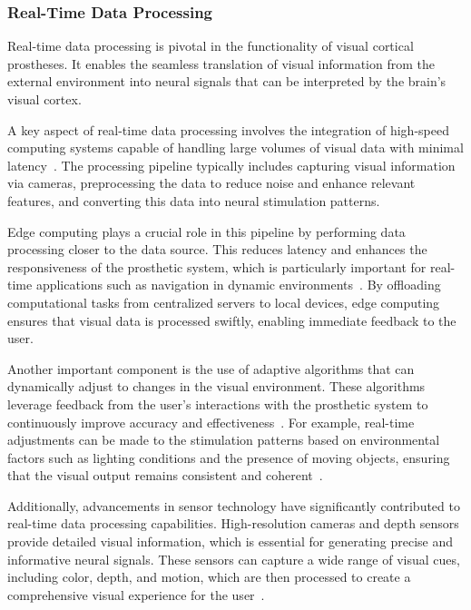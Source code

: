 \documentclass[twocolumn,10pt]{article}
\begin{document}
\subsubsection*{Real-Time Data Processing}
Real-time data processing is pivotal in the functionality of visual cortical
prostheses. It enables the seamless translation of visual information from the
external environment into neural signals that can be interpreted by the brain's
visual cortex.

A key aspect of real-time data processing involves the integration of high-speed
computing systems capable of handling large volumes of visual data with minimal
latency~\cite{nurmikkoChallengesLargeScaleCortical2020}. The processing pipeline typically includes capturing visual information
via cameras, preprocessing the data to reduce noise and enhance relevant
features, and converting this data into neural stimulation patterns.

Edge computing plays a crucial role in this pipeline by performing data
processing closer to the data source. This reduces latency and enhances the
responsiveness of the prosthetic system, which is particularly important for
real-time applications such as navigation in dynamic
environments~\cite{wangDeepLearningEdge2020}. By offloading computational tasks
from centralized servers to local devices, edge computing ensures that visual
data is processed swiftly, enabling immediate feedback to the user.

Another important component is the use of adaptive algorithms that can
dynamically adjust to changes in the visual environment. These algorithms
leverage feedback from the user's interactions with the prosthetic system to
continuously improve accuracy and
effectiveness~\cite{pio-lopezVisualCorticalProsthesis2021b}. For example,
real-time adjustments can be made to the stimulation patterns based on
environmental factors such as lighting conditions and the presence of moving
objects, ensuring that the visual output remains consistent and
coherent~\cite{fylstraHumanprosthesisCooperationCombining2022}.

Additionally, advancements in sensor technology have significantly contributed
to real-time data processing capabilities. High-resolution cameras and depth
sensors provide detailed visual information, which is essential for generating
precise and informative neural signals. These sensors can capture a wide range
of visual cues, including color, depth, and motion, which are then processed to
create a comprehensive visual experience for the
user~\cite{rueckauerExperiencingProstheticVision2022}.
\end{document}
